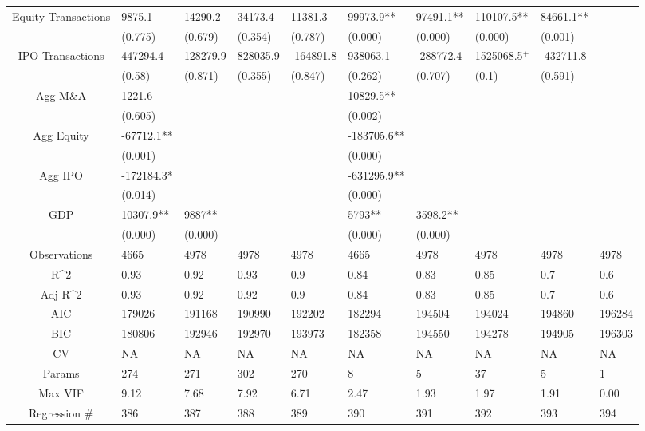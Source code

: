 \documentclass{article}
\begin{document}
\begin{table}[H]
\begin{tabular}{|clllllllll|}
  Equity Transactions & 9875.1 & 14290.2 & 34173.4 & 11381.3 & 99973.9** & 97491.1** & 110107.5** & 84661.1** &  \\ 
   & (0.775) & (0.679) & (0.354) & (0.787) & (0.000) & (0.000) & (0.000) & (0.001) &  \\ 
  IPO Transactions & 447294.4 & 128279.9 & 828035.9 & -164891.8 & 938063.1 & -288772.4 & 1525068.5$^{+}$ & -432711.8 &  \\ 
   & (0.58) & (0.871) & (0.355) & (0.847) & (0.262) & (0.707) & (0.1) & (0.591) &  \\ 
  Agg M\&A & 1221.6 &  &  &  & 10829.5** &  &  &  &  \\ 
   & (0.605) &  &  &  & (0.002) &  &  &  &  \\ 
  Agg Equity & -67712.1** &  &  &  & -183705.6** &  &  &  &  \\ 
   & (0.001) &  &  &  & (0.000) &  &  &  &  \\ 
  Agg IPO & -172184.3* &  &  &  & -631295.9** &  &  &  &  \\ 
   & (0.014) &  &  &  & (0.000) &  &  &  &  \\ 
  GDP & 10307.9** & 9887** &  &  & 5793** & 3598.2** &  &  &  \\ 
   & (0.000) & (0.000) &  &  & (0.000) & (0.000) &  &  &  \\ 
  \hline 
 Observations & 4665 & 4978 & 4978 & 4978 & 4665 & 4978 & 4978 & 4978 & 4978 \\ 
  R^2 & 0.93 & 0.92 & 0.93 & 0.9 & 0.84 & 0.83 & 0.85 & 0.7 & 0.6 \\ 
  Adj R^2 & 0.93 & 0.92 & 0.92 & 0.9 & 0.84 & 0.83 & 0.85 & 0.7 & 0.6 \\ 
  AIC & 179026 & 191168 & 190990 & 192202 & 182294 & 194504 & 194024 & 194860 & 196284 \\ 
  BIC & 180806 & 192946 & 192970 & 193973 & 182358 & 194550 & 194278 & 194905 & 196303 \\ 
  CV & NA & NA & NA & NA & NA & NA & NA & NA & NA \\ 
  Params & 274 & 271 & 302 & 270 & 8 & 5 & 37 & 5 & 1 \\ 
  Max VIF & 9.12 & 7.68 & 7.92 & 6.71 & 2.47 & 1.93 & 1.97 & 1.91 & 0.00 \\ 
  Regression \# & 386 & 387 & 388 & 389 & 390 & 391 & 392 & 393 & 394 \\ 
   \hline
\end{tabular}
 
\end{table}
\end{document}
